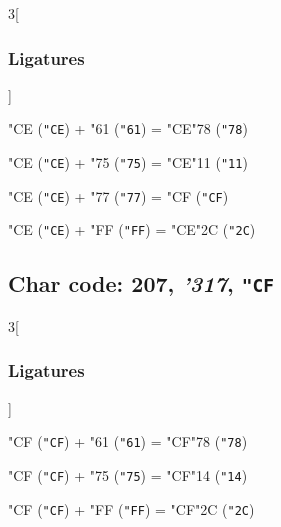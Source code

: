 \documentclass{article}
\newlength{\maxcharwidth}
\begin{document}
\begin{multicols}{3}[\subsubsection{Ligatures}]

{\testfont\char"CE\noboundary} ({\tt"CE}) + {\testfont\char"61\noboundary} ({\tt"61}) = {\testfont\char"CE\noboundary}{\testfont\char"78\noboundary} ({\tt"78}) 

{\testfont\char"CE\noboundary} ({\tt"CE}) + {\testfont\char"75\noboundary} ({\tt"75}) = {\testfont\char"CE\noboundary}{\testfont\char"11\noboundary} ({\tt"11}) 

{\testfont\char"CE\noboundary} ({\tt"CE}) + {\testfont\char"77\noboundary} ({\tt"77}) = {\testfont\char"CF\noboundary} ({\tt"CF}) 

{\testfont\char"CE\noboundary} ({\tt"CE}) + {\testfont\char"FF\noboundary} ({\tt"FF}) = {\testfont\char"CE\noboundary}{\testfont\char"2C\noboundary} ({\tt"2C}) 

\end{multicols}

\subsection{Char code: 207, {\it'317}, {\tt"CF}}
\label{char_207}


\begin{multicols}{3}[\subsubsection{Ligatures}]

{\testfont\char"CF\noboundary} ({\tt"CF}) + {\testfont\char"61\noboundary} ({\tt"61}) = {\testfont\char"CF\noboundary}{\testfont\char"78\noboundary} ({\tt"78}) 

{\testfont\char"CF\noboundary} ({\tt"CF}) + {\testfont\char"75\noboundary} ({\tt"75}) = {\testfont\char"CF\noboundary}{\testfont\char"14\noboundary} ({\tt"14}) 

{\testfont\char"CF\noboundary} ({\tt"CF}) + {\testfont\char"FF\noboundary} ({\tt"FF}) = {\testfont\char"CF\noboundary}{\testfont\char"2C\noboundary} ({\tt"2C}) 

\end{multicols}
\end{document}
